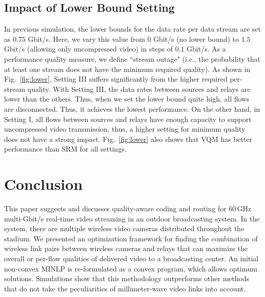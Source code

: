 \documentclass[conference]{IEEEtran}
\begin{document}
\subsection{Impact of Lower Bound Setting}\label{sec:sim04}
In previous simulation, the lower bounds for the data rate per data stream are set as $0.75$ Gbit/s. Here, we vary this value from $0$ Gbit/s (no lower bound) to $1.5$ Gbit/s (allowing only uncompressed video) in steps of $0.1$ Gbit/s. As a performance quality measure, we define ``stream outage" (i.e., the probability that at least one stream does not have the minimum required quality).
As shown in Fig.~\ref{fig:lower}, Setting III suffers significantly from the higher required per-stream quality.
With Setting III, the data rates between sources and relays are lower than the others.
Thus, when we set the lower bound quite high, all flows are disconnected. Thus, it achieves the lowest performance.
On the other hand, in Setting I, all flows between sources and relays have enough capacity to support uncompressed video transmission, thus, a higher setting for minimum quality does not have a strong impact.
Fig.~\ref{fig:lower} also shows that \textsf{VQM} has better performance than \textsf{SRM} for all settings.
\section{Conclusion}\label{sec:conclusions}
This paper suggests and discusses quality-aware coding and routing for 60\,GHz multi-Gbit/s real-time video streaming in an outdoor broadcasting system.
In the system, there are multiple wireless video cameras distributed throughout the stadium.
We presented an optimization framework for finding the combination of wireless link pairs between wireless cameras and relays that can maximize the overall or per-flow qualities of delivered video to a broadcasting center.
An initial non-convex MINLP is re-formulated as a convex program, which allows optimum solutions. Simulations show that this methodology outperforms other methods that do not take the peculiarities of millimeter-wave video links into account.
\end{document}
